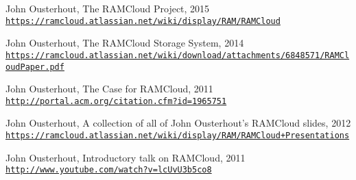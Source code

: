 \begin{thebibliography}{99}

 John Ousterhout, The RAMCloud Project, 2015\\
\mbox{}\hfill\texttt{\url{https://ramcloud.atlassian.net/wiki/display/RAM/RAMCloud}}

 John Ousterhout, The RAMCloud Storage System, 2014\\
\mbox{}\hfill\texttt{\url{https://ramcloud.atlassian.net/wiki/download/attachments/6848571/RAMCloudPaper.pdf}}

 John Ousterhout, The Case for RAMCloud, 2011\\
\mbox{}\hfill\texttt{\url{http://portal.acm.org/citation.cfm?id=1965751}}

 John Ousterhout, A collection of all of John Ousterhout's RAMCloud slides, 2012\\
\mbox{}\hfill\texttt{\url{https://ramcloud.atlassian.net/wiki/display/RAM/RAMCloud+Presentations}}

 John Ousterhout, Introductory talk on RAMCloud, 2011\\
\mbox{}\hfill\texttt{\url{http://www.youtube.com/watch?v=lcUvU3b5co8}}


\end{thebibliography}

